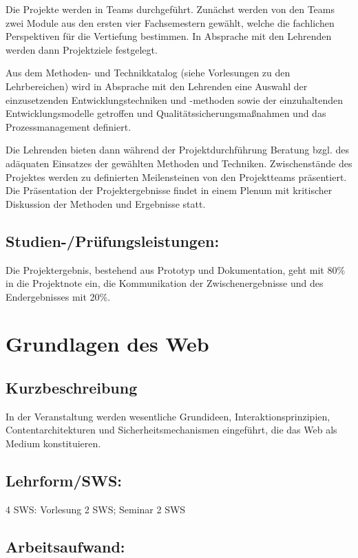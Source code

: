 Die Projekte werden in Teams durchgeführt. Zunächst werden von den Teams
zwei Module aus den ersten vier Fachsemestern gewählt, welche die
fachlichen Perspektiven für die Vertiefung bestimmen. In Absprache mit
den Lehrenden werden dann Projektziele festgelegt.

Aus dem Methoden- und Technikkatalog (siehe Vorlesungen zu den
Lehrbereichen) wird in Absprache mit den Lehrenden eine Auswahl der
einzusetzenden Entwicklungstechniken und -methoden sowie der
einzuhaltenden Entwicklungsmodelle getroffen und
Qualitätssicherungsmaßnahmen und das Prozessmanagement definiert.

Die Lehrenden bieten dann während der Projektdurchführung Beratung bzgl.
des adäquaten Einsatzes der gewählten Methoden und Techniken.
Zwischenstände des Projektes werden zu definierten Meilensteinen von den
Projektteams präsentiert. Die Präsentation der Projektergebnisse findet
in einem Plenum mit kritischer Diskussion der Methoden und Ergebnisse
statt.

\section*{Studien-/Prüfungsleistungen:}\label{studien-pruxfcfungsleistungen-6}

Die Projektergebnis, bestehend aus Prototyp und Dokumentation, geht mit
80\% in die Projektnote ein, die Kommunikation der Zwischenergebnisse
und des Endergebnisses mit 20\%.

\chapter{Grundlagen des Web}\label{grundlagen-des-web}

\section*{Kurzbeschreibung}\label{kurzbeschreibung-1}

In der Veranstaltung werden wesentliche Grundideen,
Interaktionsprinzipien, Contentarchitekturen und Sicherheitsmechanismen
eingeführt, die das Web als Medium konstituieren.

\section*{Lehrform/SWS:}\label{lehrformsws-7}

4 SWS: Vorlesung 2 SWS; Seminar 2 SWS

\section*{Arbeitsaufwand:}\label{arbeitsaufwand-7}

